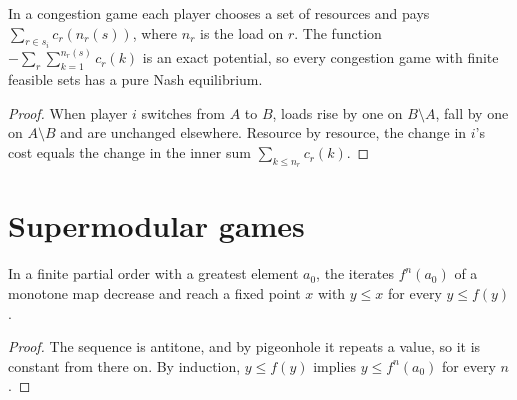 \begin{theorem}
\label{thm:rosenthal}
\leanok
{}
In a congestion game each player chooses a set of resources and pays $\sum_{r \in s_i} c_r(n_r(s))$, where $n_r$
is the load on $r$. The function $-\sum_r \sum_{k=1}^{n_r(s)} c_r(k)$ is an exact potential, so every congestion
game with finite feasible sets has a pure Nash equilibrium.
\end{theorem}
\begin{proof}
\leanok
When player $i$ switches from $A$ to $B$, loads rise by one on $B \setminus A$, fall by one on $A \setminus B$ and
are unchanged elsewhere. Resource by resource, the change in $i$'s cost equals the change in the inner sum
$\sum_{k \le n_r} c_r(k)$.
\end{proof}

\section{Supermodular games}
\label{sec:supermodular}

\begin{lemma}
\label{lem:tarski-finite}
\leanok
In a finite partial order with a greatest element $a_0$, the iterates $f^n(a_0)$ of a monotone map decrease and
reach a fixed point $x$ with $y \le x$ for every $y \le f(y)$.
\end{lemma}
\begin{proof}
\leanok
The sequence is antitone, and by pigeonhole it repeats a value, so it is constant from there on. By induction,
$y \le f(y)$ implies $y \le f^n(a_0)$ for every $n$.
\end{proof}

